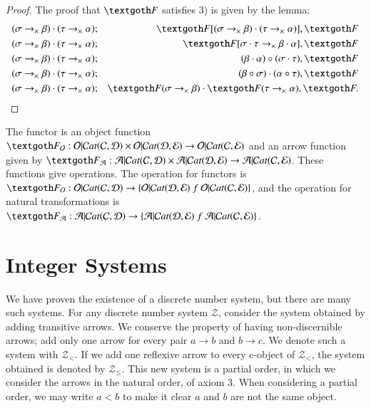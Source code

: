\documentclass [12pt]{book}
\begin{document}
\begin{proof}
The proof that $\textgoth F$ satisfies 3) is given by the lemma:\begin{eqnarray}\nonumber(\sigma\rightarrow
_\times\beta)\cdot(\tau\rightarrow_\times\alpha)&;&\textgoth F[(\sigma\rightarrow
_\times\beta)\cdot(\tau\rightarrow_\times\alpha)],\textgoth F\\\nonumber(\sigma\rightarrow
_\times\beta)\cdot(\tau\rightarrow_\times\alpha)&;&\textgoth F[\sigma\cdot\tau
\rightarrow_\times\beta\cdot\alpha],\textgoth F\\\nonumber(\sigma\rightarrow
_\times\beta)\cdot(\tau\rightarrow_\times\alpha)&;&(\beta\cdot\alpha)\circ(\sigma\cdot\tau
),\textgoth F\\\nonumber(\sigma\rightarrow
_\times\beta)\cdot(\tau\rightarrow_\times\alpha)&;&(\beta\circ\sigma)\cdot(\alpha\circ\tau
),\textgoth F\\\nonumber(\sigma\rightarrow
_\times\beta)\cdot(\tau\rightarrow_\times\alpha)&;&\textgoth F(\sigma\rightarrow_\times\beta)\cdot\textgoth F(\tau\rightarrow_\times\alpha
),\textgoth F.\end{eqnarray}\end{proof}

The functor is an object function $\textgoth F_\mathcal O:\mathcal O|\mathcal Cat(\mathcal C,\mathcal D)\times\mathcal O|\mathcal Cat(\mathcal D,\mathcal E)\rightarrow\mathcal O|\mathcal Cat(\mathcal C,\mathcal E)$ and an arrow function given by $\textgoth F_\mathcal A:\mathcal A|\mathcal Cat(\mathcal C,\mathcal D)\times\mathcal A|\mathcal Cat(\mathcal D,\mathcal E)\rightarrow\mathcal A|\mathcal Cat(\mathcal C,\mathcal E)$. These functions give operations. The operation for functors is $\textgoth F_\mathcal O:\mathcal O|\mathcal Cat(\mathcal C,\mathcal D)\rightarrow\{\mathcal O|\mathcal Cat(\mathcal D,\mathcal E)~f~\mathcal O|\mathcal Cat(\mathcal C,\mathcal E)\}$, and the operation for natural transformations is $\textgoth F_\mathcal A:\mathcal A|\mathcal Cat(\mathcal C,\mathcal D)\rightarrow\{\mathcal A|\mathcal Cat(\mathcal D,\mathcal E)~f~\mathcal A|\mathcal Cat(\mathcal C,\mathcal E)\}$.

	\section{Integer Systems}

We have proven the existence of a discrete number system, but there are many such systems. For any discrete number system $\mathcal Z$, consider the system obtained by adding transitive arrows. We conserve the property of having non-discernible arrows; add only one arrow for every pair $a\rightarrow b$ and $b\rightarrow c$. We denote such a system with $\mathcal Z_<$. If we add one reflexive arrow to every c-object of $\mathcal Z_<$, the system obtained is denoted by $\mathcal{Z}_{\leq}$. This new system is a partial order, in which we consider the arrows in the natural order, of axiom 3. When considering a partial order, we may write $a<b$ to make it clear $a$ and $b$ are not the same object.
\end{document}
